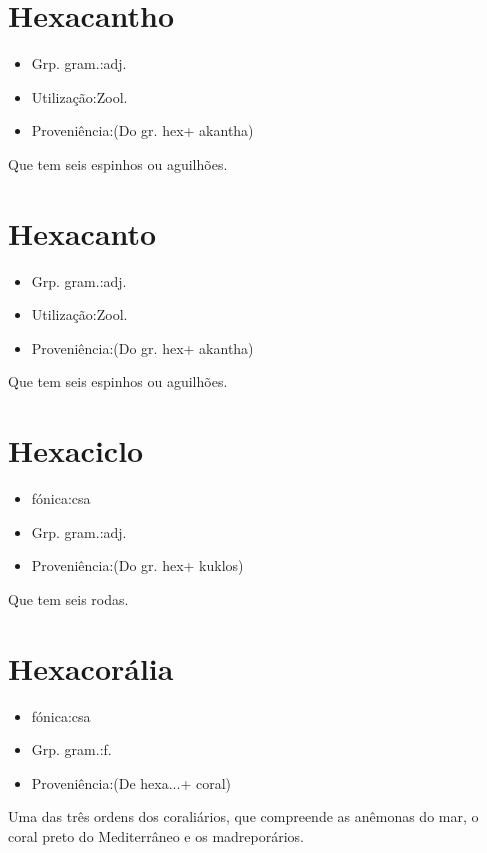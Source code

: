 \documentclass{article}
\begin{document}
\section{Hexacantho}
\begin{itemize}
\item {Grp. gram.:adj.}
\end{itemize}
\begin{itemize}
\item {Utilização:Zool.}
\end{itemize}
\begin{itemize}
\item {Proveniência:(Do gr. \textunderscore hex\textunderscore  + \textunderscore akantha\textunderscore )}
\end{itemize}
Que tem seis espinhos ou aguilhões.
\section{Hexacanto}
\begin{itemize}
\item {Grp. gram.:adj.}
\end{itemize}
\begin{itemize}
\item {Utilização:Zool.}
\end{itemize}
\begin{itemize}
\item {Proveniência:(Do gr. \textunderscore hex\textunderscore  + \textunderscore akantha\textunderscore )}
\end{itemize}
Que tem seis espinhos ou aguilhões.
\section{Hexaciclo}
\begin{itemize}
\item {fónica:csa}
\end{itemize}
\begin{itemize}
\item {Grp. gram.:adj.}
\end{itemize}
\begin{itemize}
\item {Proveniência:(Do gr. \textunderscore hex\textunderscore  + \textunderscore kuklos\textunderscore )}
\end{itemize}
Que tem seis rodas.
\section{Hexacorália}
\begin{itemize}
\item {fónica:csa}
\end{itemize}
\begin{itemize}
\item {Grp. gram.:f.}
\end{itemize}
\begin{itemize}
\item {Proveniência:(De \textunderscore hexa...\textunderscore  + \textunderscore coral\textunderscore )}
\end{itemize}
Uma das três ordens dos coraliários, que compreende as anêmonas do mar, o coral preto do Mediterrâneo e os madreporários.
\end{document}
